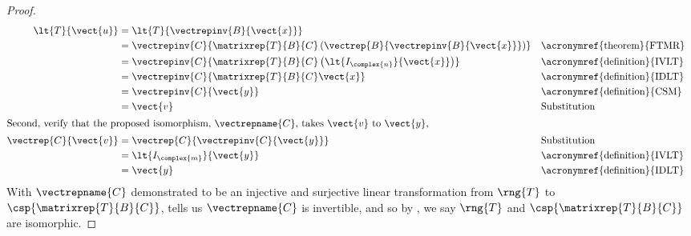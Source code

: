 \begin{proof}
\begin{align*}
\lt{T}{\vect{u}}&=\lt{T}{\vectrepinv{B}{\vect{x}}}\\
&=\vectrepinv{C}{\matrixrep{T}{B}{C}\left(\vectrep{B}{\vectrepinv{B}{\vect{x}}}\right)}&&\text{\acronymref{theorem}{FTMR}}\\
&=\vectrepinv{C}{\matrixrep{T}{B}{C}\left(\lt{I_{\complex{n}}}{\vect{x}}\right)}&&\text{\acronymref{definition}{IVLT}}\\
&=\vectrepinv{C}{\matrixrep{T}{B}{C}\vect{x}}&&\text{\acronymref{definition}{IDLT}}\\
&=\vectrepinv{C}{\vect{y}}&&\text{\acronymref{definition}{CSM}}\\
&=\vect{v}&&\text{Substitution}\\
%
\intertext{Second, verify that the proposed isomorphism, $\vectrepname{C}$, takes $\vect{v}$ to $\vect{y}$,}
%
\vectrep{C}{\vect{v}}&=\vectrep{C}{\vectrepinv{C}{\vect{y}}}&&\text{Substitution}\\
&=\lt{I_{\complex{m}}}{\vect{y}}&&\text{\acronymref{definition}{IVLT}}\\
&=\vect{y}&&\text{\acronymref{definition}{IDLT}}
%
\end{align*}
%
With $\vectrepname{C}$ demonstrated to be an injective and surjective linear transformation from $\rng{T}$ to $\csp{\matrixrep{T}{B}{C}}$,  tells us $\vectrepname{C}$ is invertible, and so by , we say $\rng{T}$ and $\csp{\matrixrep{T}{B}{C}}$ are isomorphic.
%
\end{proof}
%
